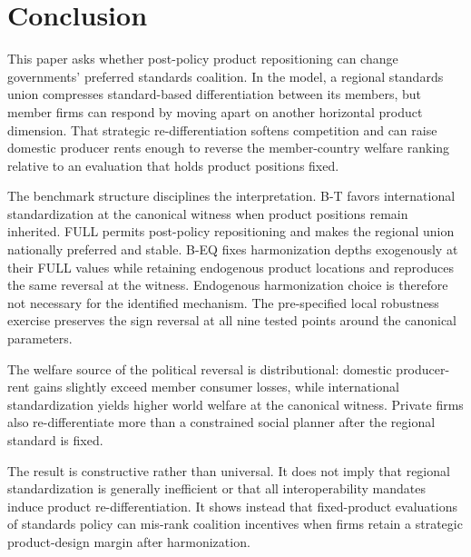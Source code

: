 \section{Conclusion}\label{sec:conclusion}

This paper asks whether post-policy product repositioning can change governments' preferred standards coalition. In the model, a regional standards union compresses standard-based differentiation between its members, but member firms can respond by moving apart on another horizontal product dimension. That strategic re-differentiation softens competition and can raise domestic producer rents enough to reverse the member-country welfare ranking relative to an evaluation that holds product positions fixed.

The benchmark structure disciplines the interpretation. B-T favors international standardization at the canonical witness when product positions remain inherited. FULL permits post-policy repositioning and makes the regional union nationally preferred and stable. B-EQ fixes harmonization depths exogenously at their FULL values while retaining endogenous product locations and reproduces the same reversal at the witness. Endogenous harmonization choice is therefore not necessary for the identified mechanism. The pre-specified local robustness exercise preserves the sign reversal at all nine tested points around the canonical parameters.

The welfare source of the political reversal is distributional: domestic producer-rent gains slightly exceed member consumer losses, while international standardization yields higher world welfare at the canonical witness. Private firms also re-differentiate more than a constrained social planner after the regional standard is fixed.

The result is constructive rather than universal. It does not imply that regional standardization is generally inefficient or that all interoperability mandates induce product re-differentiation. It shows instead that fixed-product evaluations of standards policy can mis-rank coalition incentives when firms retain a strategic product-design margin after harmonization.